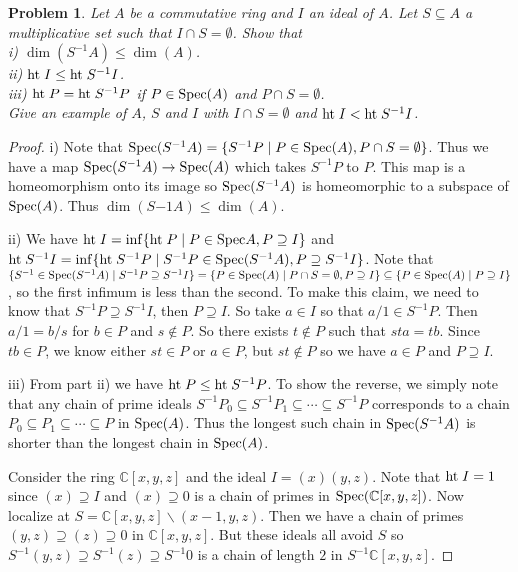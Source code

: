 \documentclass{article}
\newcommand{\spec}{\textup{Spec}}
\newcommand{\Ht}{\textup{ht}\;}
\newtheorem{problem}{Problem}
\begin{document}
\begin{problem}
Let $A$ be a commutative ring and $I$ an ideal of $A$. Let $S \subseteq A$ a multiplicative set such that $I \cap S = \emptyset$. Show that\\
i) $\dim(S^{-1}A) \leq \dim(A)$.\\
ii) $\Ht I \leq \Ht S^{-1}I$.\\
iii) $\Ht P = \Ht S^{-1}P$ if $P \in \spec(A)$ and $P \cap S = \emptyset$.\\
Give an example of $A$, $S$ and $I$ with $I \cap S = \emptyset$ and $\Ht I < \Ht S^{-1}I$.
\end{problem}
\begin{proof}
i) Note that $\spec(S^{-1}A) = \{S^{-1}P \mid P \in \spec(A), P \cap S = \emptyset\}$. Thus we have a map $\spec(S^{-1}A) \to \spec(A)$ which takes $S^{-1}P$ to $P$. This map is a homeomorphism onto its image so $\spec(S^{-1}A)$ is homeomorphic to a subspace of $\spec(A)$. Thus $\dim(S{-1}A) \leq \dim(A)$.

ii) We have $\Ht I = \inf \{\Ht P \mid P \in \spec A, P \supseteq I\}$ and $\Ht S^{-1}I = \inf \{\Ht S^{-1}P \mid S^{-1}P \in \spec(S^{-1}A), P \supseteq S^{-1}I\}$. Note that $\{S^{-1} \in \spec(S^{-1}A) \mid S^{-1}P \supseteq S^{-1}I\} = \{P \in \spec(A) \mid P \cap S = \emptyset, P \supseteq I\} \subseteq \{P \in \spec(A) \mid P \supseteq I\}$, so the first infimum is less than the second. To make this claim, we need to know that $S^{-1}P \supseteq S^{-1}I$, then $P \supseteq I$. So take $a \in I$ so that $a/1 \in S^{-1}P$. Then $a/1 = b/s$ for $b \in P$ and $s \notin P$. So there exists $t \notin P$ such that $sta = tb$. Since $tb \in P$, we know either $st \in P$ or $a \in P$, but $st \notin P$ so we have $a \in P$ and $P \supseteq I$.

iii) From part ii) we have $\Ht P \leq \Ht S^{-1}P$. To show the reverse, we simply note that any chain of prime ideals $S^{-1}P_0 \subseteq S^{-1}P_1 \subseteq \cdots \subseteq S^{-1}P$ corresponds to a chain $P_0 \subseteq P_1 \subseteq \cdots \subseteq P$ in $\spec(A)$. Thus the longest such chain in $\spec(S^{-1}A)$ is shorter than the longest chain in $\spec(A)$.

Consider the ring $\mathbb{C}[x,y,z]$ and the ideal $I = (x)(y,z)$. Note that $\Ht I = 1$ since $(x) \supseteq I$ and $(x) \supseteq 0$ is a chain of primes in $\spec(\mathbb{C}[x,y,z])$. Now localize at $S = \mathbb{C}[x,y,z] \backslash (x-1, y, z)$. Then we have a chain of primes $(y,z) \supseteq (z) \supseteq 0$ in $\mathbb{C}[x,y,z]$. But these ideals all avoid $S$ so $S^{-1}(y,z) \supseteq S^{-1}(z) \supseteq S^{-1}0$ is a chain of length $2$ in $S^{-1}\mathbb{C}[x,y,z]$.
\end{proof}
\end{document}
